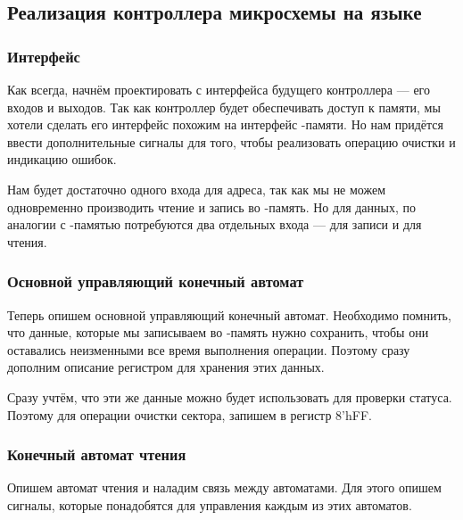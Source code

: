 \subsection{Реализация контроллера микросхемы  на языке }

\subsubsection{Интерфейс}
\par{Как всегда, начнём проектировать с интерфейса будущего контроллера --- его входов и выходов. Так как контроллер будет обеспечивать доступ к памяти, мы хотели сделать его интерфейс похожим на интерфейс -памяти. Но нам придётся ввести дополнительные сигналы для того, чтобы реализовать операцию очистки и индикацию ошибок.}
\par{Нам будет достаточно одного входа для адреса, так как мы не можем одновременно производить чтение и запись во -память. Но для данных, по аналогии с -памятью потребуются два отдельных входа --- для записи и для чтения.}

\noindent
  

\subsubsection{Основной управляющий конечный автомат}
\par{Теперь опишем основной управляющий конечный автомат. Необходимо помнить, что данные, которые мы записываем во -память нужно сохранить, чтобы они оставались неизменными все время выполнения операции. Поэтому сразу дополним описание регистром для хранения этих данных.}
\par{Сразу учтём, что эти же данные можно будет использовать для проверки статуса. Поэтому для операции очистки сектора, запишем в регистр 8'hFF.}
\noindent
  

\pagebreak
\subsubsection{Конечный автомат чтения}
\par{Опишем автомат чтения и наладим связь между автоматами. Для этого опишем сигналы, которые понадобятся для управления каждым из этих автоматов.}

